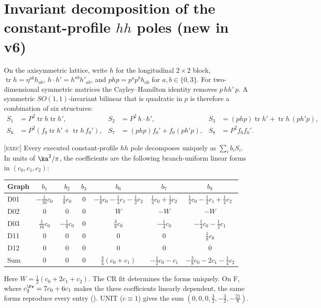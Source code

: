 \section{Invariant decomposition of the constant-profile \texorpdfstring{\(hh\)}{hh} poles (new in v6)}
\label{sec:structures}

On the axisymmetric lattice, write \(h\) for the longitudinal
\(2\times2\) block, \(\operatorname{tr}h=\eta^{ab}h_{ab}\),
\(h\cdot h'=h^{ab}h'_{ab}\), and
\(php=p^ap^bh_{ab}\) for \(a,b\in\{0,3\}\).
For two-dimensional symmetric matrices the Cayley--Hamilton
identity removes \(p\,hh'\,p\).
A symmetric \(SO(1,1)\)-invariant bilinear that is quadratic in
\(p\) is therefore a combination of six structures:
\begin{align*}
S_1&=P^2\operatorname{tr}h\operatorname{tr}h', &
S_2&=P^2\,h\cdot h', &
S_3&=(php)\operatorname{tr}h'+\operatorname{tr}h\,(ph'p),\\
S_6&=P^2(f_0\operatorname{tr}h'+\operatorname{tr}h\,f_0'), &
S_7&=(php)f_0'+f_0(ph'p), &
S_8&=P^2f_0f_0'.
\end{align*}

\begin{proposition}
\label{prop:structures}
\textsc{[exec]}
Every executed constant-profile \(hh\) pole decomposes uniquely as
\(\sum_ib_iS_i\).
In units of \(\ka^2/\pi\), the coefficients are the following
branch-uniform linear forms in \((c_0,c_1,c_2)\):
\begin{center}
\small
\begin{tabular}{@{}lcccccc@{}}
\toprule
Graph & \(b_1\) & \(b_2\) & \(b_3\) & \(b_6\) & \(b_7\) & \(b_8\)\\
\midrule
D01 & \(-\tfrac1{16}c_0\) & \(\tfrac18c_0\) & \(0\) &
\(-\tfrac18c_0-\tfrac14c_1-\tfrac12c_2\) &
\(\tfrac14c_0+\tfrac12c_2\) &
\(\tfrac14c_0-\tfrac12c_1+\tfrac14c_2\)\\
D02 & \(0\) & \(0\) & \(0\) & \(W\) & \(-W\) & \(-W\)\\
D03 & \(\tfrac1{16}c_0\) & \(-\tfrac18c_0\) & \(0\) &
\(\tfrac38c_0\) & \(-\tfrac14c_0\) &
\(-\tfrac14c_0-\tfrac12c_1\)\\
D11 & \(0\) & \(0\) & \(0\) & \(0\) & \(0\) & \(\tfrac18c_0\)\\
D12 & \(0\) & \(0\) & \(0\) & \(0\) & \(0\) & \(0\)\\
\midrule
Sum & \(0\) & \(0\) & \(0\) &
\(\tfrac34(c_0+c_1)\) & \(-\tfrac12c_0-c_1\) &
\(-\tfrac38c_0-2c_1-\tfrac14c_2\)\\
\bottomrule
\end{tabular}
\end{center}
Here \(W=\tfrac12(c_0+2c_1+c_2)\).
The CR fit determines the forms uniquely.
On F, where \(c_2^\Fr=7c_0+6c_1\) makes the three coefficients
linearly dependent, the same forms reproduce every entry
().
UNIT (\(c\equiv1\)) gives the sum
\((0,0,0,\tfrac32,-\tfrac32,-\tfrac{21}8)\).
\end{proposition}

